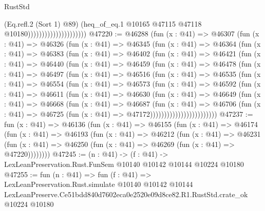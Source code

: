 \begin{lexlean}{RustStd}
\begin{coremodule}
                                            (Eq.refl.{2} (Sort 1) @89)
                                            (heq_of_eq.{1}
                                              @10165
                                              @47115
                                              @47118
                                              @10180)))))))))))))))))))))
@47220 := @46288
    (fun (x : @41) =>
    @46307
      (fun (x : @41) =>
      @46326
        (fun (x : @41) =>
        @46345
          (fun (x : @41) =>
          @46364
            (fun (x : @41) =>
            @46383
              (fun (x : @41) =>
              @46402
                (fun (x : @41) =>
                @46421
                  (fun (x : @41) =>
                  @46440
                    (fun (x : @41) =>
                    @46459
                      (fun (x : @41) =>
                      @46478
                        (fun (x : @41) =>
                        @46497
                          (fun (x : @41) =>
                          @46516
                            (fun (x : @41) =>
                            @46535
                              (fun (x : @41) =>
                              @46554
                                (fun (x : @41) =>
                                @46573
                                  (fun (x : @41) =>
                                  @46592
                                    (fun (x : @41) =>
                                    @46611
                                      (fun (x : @41) =>
                                      @46630
                                        (fun (x : @41) =>
                                        @46649
                                          (fun (x : @41) =>
                                          @46668
                                            (fun (x : @41) =>
                                            @46687
                                              (fun (x : @41) =>
                                              @46706
                                                (fun (x : @41) =>
                                                @46725
                                                  (fun (x : @41) => @47172))))))))))))))))))))))))
@47237 := fun (x : @41) =>
  @46136
    (fun (x : @41) =>
    @46155
      (fun (x : @41) =>
      @46174
        (fun (x : @41) =>
        @46193
          (fun (x : @41) =>
          @46212
            (fun (x : @41) =>
            @46231
              (fun (x : @41) => @46250 (fun (x : @41) => @46269 (fun (x : @41) => @47220))))))))
@47245 := (n : @41) ->
  (f : @41) -> LexLeanPreservation.Rust.FunSem @10140 @10142 @10144 @10224 @10180
@47255 := fun (n : @41) =>
  fun (f : @41) =>
  LexLeanPreservation.Rust.simulate
    @10140
    @10142
    @10144
    LexLeanPreserve.Ce51bdd840d7602eca0e2520e09d8ce82.R1.RustStd.crate_ok
    @10224
    @10180
\end{coremodule}
\end{lexlean}

